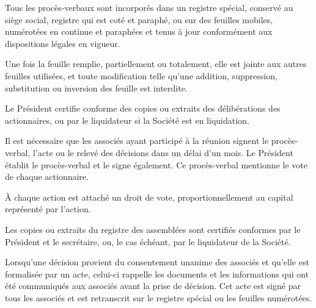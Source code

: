 \documentclass[a4paper,12pt]{report}
\begin{document}
Tous les procès-verbaux sont incorporés dans un registre spécial, conservé au siège social, registre qui est coté et paraphé, ou sur des feuilles mobiles, numérotées en continue et paraphées et tenus à jour conformément aux dispositions légales en vigueur.

Une fois la feuille remplie, partiellement ou totalement, elle est jointe aux autres feuilles utilisées, et toute modification telle qu'une addition, suppression, substitution ou inversion des feuille est interdite.

Le Président certifie conforme des copies ou extraits des délibérations des actionnaires, ou par le liquidateur si la Société est en liquidation.

Il est nécessaire que les associés ayant participé à la réunion signent le procès-verbal, l'acte ou le relevé des décisions dans un délai d'un mois. Le Président établit le procès-verbal et le signe également. Ce procès-verbal mentionne le vote de chaque actionnaire.

À chaque action est attaché un droit de vote, proportionnellement au capital représenté par l'action.

Les copies ou extraits du registre des assemblées sont certifiés conformes par le Président et le secrétaire, ou, le cas échéant, par le liquidateur de la Société.

Lorsqu'une décision provient du consentement unanime des associés et qu'elle est formalisée par un acte, celui-ci rappelle les documents et les informations qui ont été communiqués aux associés avant la prise de décision. Cet acte est signé par tous les associés et est retranscrit sur le registre spécial ou les feuilles numérotées.

%
%
\end{document}
